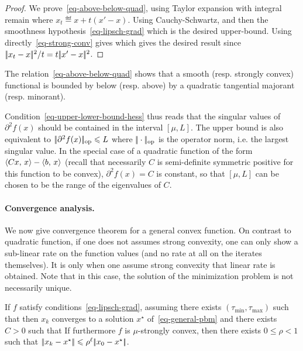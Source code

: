 \begin{proof}
	We prove~\eqref{eq-above-below-quad}, using Taylor expansion with integral remain
	where $x_t \eqdef x+t(x'-x)$.
	Using Cauchy-Schwartz, and then the smoothness hypothesis~\eqref{eq-lipsch-grad}
	which is the desired upper-bound. Using directly~\eqref{eq-strong-conv} gives 
	which gives the desired result since $|\!| x_t-x |\!|^2 / t = t |\!| x'-x |\!|^2$.
\end{proof}

The relation~\eqref{eq-above-below-quad} shows that a smooth (resp. strongly convex) functional is bounded by below (resp. above) by a quadratic tangential majorant (resp. minorant). 

Condition~\eqref{eq-upper-lower-bound-hess} thus reads that the singular values of $\partial^2 f(x)$ should be contained in the interval $[\mu,L]$. The upper bound is also equivalent to $|\!| \partial^2 f(x) |\!|_{\text{op}} \leqslant L$ where $|\!| \cdot |\!|_{\text{op}}$ is the operator norm, i.e. the largest singular value. 
%
In the special case of a quadratic function of the form $\langle Cx,\,x\rangle-\langle b,\,x\rangle$ (recall that necessarily $C$ is semi-definite symmetric positive for this function to be convex), $\partial^2 f(x)=C$ is constant, so that $[\mu,L]$ can be chosen to be the range of the eigenvalues of $C$.

\paragraph{Convergence analysis.}

We now give convergence theorem for a general convex function. On contrast to quadratic function, if one does not assumes strong convexity, one can only show a sub-linear rate on the function values (and no rate at all on the iterates themselves). It is only when one assume strong convexity that linear rate is obtained. 
%
Note that in this case, the solution of the minimization problem is not necessarily unique.

\begin{thm}\label{thm-gradsec-non-strong-conv}
	If $f$ satisfy conditions~\eqref{eq-lipsch-grad}, assuming there exists $(\tau_{\min},\tau_{\max})$ such that
	then $x_k$ converges to a solution $x^\star$ of~\eqref{eq-general-pbm} and
	there exists $C>0$ such that 
	If furthermore $f$ is $\mu$-strongly convex, then there exists $0 \leq \rho < 1$ such that $|\!| x_k-x^\star |\!| \leqslant \rho^\ell |\!| x_0-x^\star |\!|$.
\end{thm}

